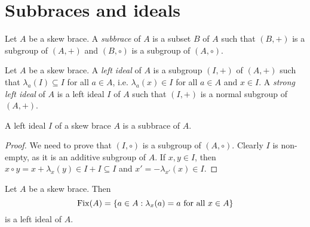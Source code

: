 

\section{Subbraces and ideals}

\begin{definition}
Let $A$ be a skew brace. A \emph{subbrace} of $A$ is a 
subset $B$ of $A$ such that $(B,+)$ is a subgroup of $(A,+)$ and $(B,\circ)$ is a subgroup of $(A,\circ)$. 
\end{definition}

\begin{definition}
    Let $A$ be a skew brace. A \emph{left ideal} of $A$ is a subgroup $(I,+)$ of
	$(A,+)$ such that $\lambda_a(I)\subseteq I$ for all $a\in A$, i.e. $\lambda_a(x)\in I$ for all $a\in A$ and $x\in I$. A \emph{strong left ideal} of $A$ 
	is a left ideal $I$ of $A$ such that $(I,+)$ is a normal subgroup of $(A,+)$. 
\end{definition}

\begin{proposition}
    A left ideal $I$ of a skew brace $A$ is a subbrace of $A$. 
\end{proposition}

\begin{proof}
    We need to prove that $(I,\circ)$ is a subgroup of $(A,\circ)$. Clearly $I$ is non-empty, 
    as it is an additive subgroup of $A$. If $x,y\in I$, then
    $x\circ y=x+\lambda_x(y)\in I+I\subseteq I$ and $x'=-\lambda_{x'}(x)\in I$. 
\end{proof}

\begin{example}
    Let $A$ be a skew brace. Then 
    \[
    \operatorname{Fix}(A)=\{a\in A:\lambda_x(a)=a\text{ for all $x\in A$}\}
    \]
    is a left ideal of $A$. 
\end{example}

